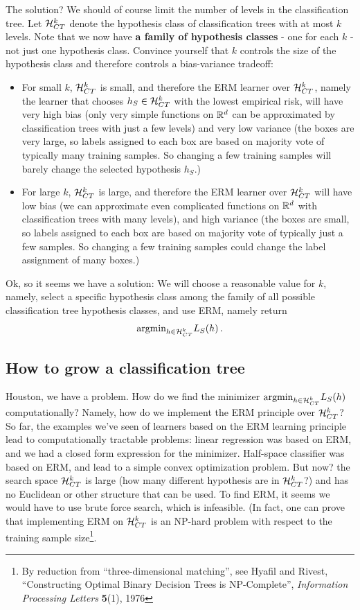  The solution? We should of course limit the number of levels in the
 classification tree. Let $\mathcal{H}_{CT}^k$ denote the hypothesis class of
 classification trees with at most $k$ levels. Note that we now have {\bf a
 family of hypothesis classes} - one for each $k$ - not just one hypothesis
 class. Convince yourself that $k$ controls the size of the hypothesis class and
 therefore controls a bias-variance tradeoff:
 \begin{itemize}
   \item
 For small $k$,  $\mathcal{H}_{CT}^k$ is
 small, and therefore the ERM learner over  $\mathcal{H}_{CT}^k$, namely the learner
 that chooses $h_S\in\mathcal{H}_{CT}^k$ with the lowest empirical risk,  will have very high bias
 (only very simple functions on $\mathbb{R}^d$ can be approximated by classification
 trees with just a few levels) and very low variance (the boxes are very large,
   so labels assigned to each box are based on majority vote of typically many
   training samples. So changing a few training samples will barely change the
 selected hypothesis $h_S$.)
 \item For large $k$,  $\mathcal{H}_{CT}^k$  is large, and therefore the ERM learner
   over  $\mathcal{H}_{CT}^k$ will have low bias (we can approximate even complicated
   functions on $\mathbb{R}^d$ with classification trees with many levels), and high
   variance (the boxes are small, so labels assigned to each box are based on
     majority vote of typically just a few samples. So changing a few training
   samples could change the label assignment of many boxes.)
\end{itemize}

Ok, so it seems we have a solution: We will choose a reasonable value for $k$,
namely, select a specific hypothesis class among the family of all possible
classification tree hypothesis classes, and use ERM, namely return 
\[
  \text{argmin}_{h\in\mathcal{H}^k_{CT}} L_S(h)\,.
 \]


 \subsection{How to grow a classification tree}

 Houston, we have a problem. How do we find the minimizer
 $\text{argmin}_{h\in\mathcal{H}^k_{CT}} L_S(h)$ computationally? Namely, how do we
 implement the ERM principle over $\mathcal{H}^k_{CT}$? 
 So far, the examples we've seen of learners based
 on the ERM learning principle lead to computationally tractable problems:
 linear regression was based on ERM, and we had a closed form expression for the
 minimizer. Half-space classifier was based on ERM, and lead to a simple
 convex optimization problem. But now? the search space $\mathcal{H}^k_{CT}$ is large
 (how many different hypothesis are in $\mathcal{H}^k_{CT}$?) and has no
 Euclidean or other structure  that can be used. To find ERM, it seems we would
 have to use brute force search, which is infeasible. (In fact, one can prove
   that implementing ERM on  $\mathcal{H}^k_{CT}$ is an NP-hard problem with respect to
   the training sample size\footnote{By
     reduction from ``three-dimensional matching'', see
     Hyafil and Rivest, ``Constructing Optimal Binary Decision Trees is
   NP-Complete'', {\em Information  Processing Letters} {\bf 5}(1), 1976}. 

